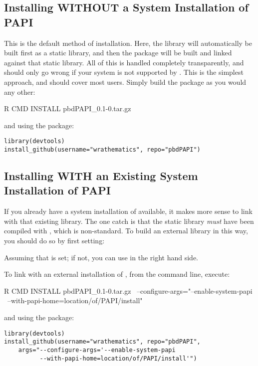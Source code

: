 \subsection{Installing WITHOUT a System Installation of PAPI}

This is the default method of installation.  Here, the \PAPI library will  
automatically be built first as a static library, and then the \thispackage 
package will be built and linked against that static library.  All of this is 
handled completely transparently, and should only go wrong if your system is not 
supported by \PAPI.  This is the simplest approach, and should cover most users. 
 Simply build the package as you would any other:
\begin{Command}
R CMD INSTALL pbdPAPI_0.1-0.tar.gz
\end{Command}
and using the  package:
\begin{lstlisting}[language=rr]
library(devtools)
install_github(username="wrathematics", repo="pbdPAPI")
\end{lstlisting}




\subsection{Installing WITH an Existing System Installation of PAPI}

If you already have a system installation of \PAPI available, it makes more  
sense to link with that existing library.  The one catch is that the static 
library \emph{must} have been compiled with , which is non-standard. 
 To build an external \PAPI library in this way, you should do so by first 
setting:
Assuming that  is set; if not, you can use  in the right hand 
side.

To link with an external installation of \PAPI, from the command line, execute:
\begin{Command}
R CMD INSTALL pbdPAPI_0.1-0.tar.gz \ 
    --configure-args="--enable-system-papi \ 
    --with-papi-home=location/of/PAPI/install"
\end{Command}
and using the  package:
\begin{lstlisting}
library(devtools)
install_github(username="wrathematics", repo="pbdPAPI", 
    args="--configure-args='--enable-system-papi 
          --with-papi-home=location/of/PAPI/install'")
\end{lstlisting}
